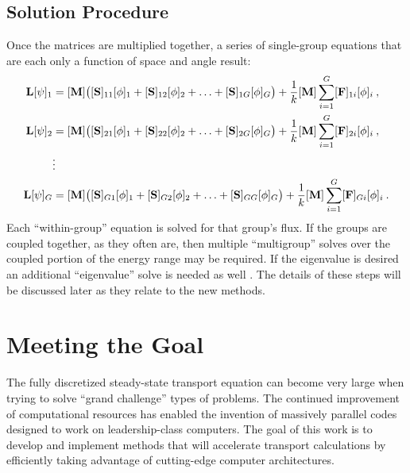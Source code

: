 \subsection{Solution Procedure}
Once the matrices are multiplied together, a series of single-group equations that are each only a function of space and angle result:
%
\begin{equation}
  \begin{aligned}
    \mathbf{L}[\psi]_1 &= [\mathbf{M}]\bigl([\mathbf{S}]_{11}[\phi]_1 + 
    [\mathbf{S}]_{12}[\phi]_2 + \ldots + [\mathbf{S}]_{1G}[\phi]_G\bigr) + 
    \frac{1}{k}[\mathbf{M}]\sum_{i=1}^{G}[\mathbf{F}]_{1i}[\phi]_{i} \:, \\
    \mathbf{L}[\psi]_2 &= [\mathbf{M}]\bigl([\mathbf{S}]_{21}[\phi]_1 + 
    [\mathbf{S}]_{22}[\phi]_2 + \ldots + [\mathbf{S}]_{2G}[\phi]_G\bigr) + 
     \frac{1}{k}[\mathbf{M}]\sum_{i=1}^{G}[\mathbf{F}]_{2i}[\phi]_{i} \:, \\
    &\vdots\\
    \mathbf{L}[\psi]_G &= [\mathbf{M}]\bigl([\mathbf{S}]_{G1}[\phi]_1 + 
    [\mathbf{S}]_{G2}[\phi]_2 + \ldots + [\mathbf{S}]_{GG}[\phi]_G\bigr) + 
     \frac{1}{k}[\mathbf{M}]\sum_{i=1}^{G}[\mathbf{F}]_{Gi}[\phi]_{i} \:.
  \end{aligned}
  \label{eq:group-equations}
\end{equation}
%
Each ``within-group'' equation is solved for that group's flux. If the groups are coupled together, as they often are, then multiple ``multigroup'' solves over the coupled portion of the energy range may be required. If the eigenvalue is desired an additional ``eigenvalue'' solve is needed as well \cite{Evans2009}. The details of these steps will be discussed later as they relate to the new methods.  


\section{Meeting the Goal}
The fully discretized steady-state transport equation can become very large when trying to solve ``grand challenge'' types of problems. The continued improvement of computational resources has enabled the invention of massively parallel codes designed to work on leadership-class computers. The goal of this work is to develop and implement methods that will accelerate transport calculations by efficiently taking advantage of cutting-edge computer architectures. 

